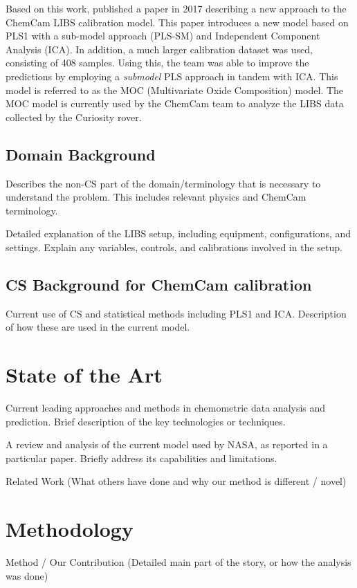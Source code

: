 Based on this work, \citeauthor{cleggRecalibrationMarsScience2017} published a paper in 2017 describing a new approach to the ChemCam LIBS calibration model.
This paper introduces a new model based on PLS1 with a sub-model approach (PLS-SM) and Independent Component Analysis (ICA).
In addition, a much larger calibration dataset was used, consisting of 408 samples.
Using this, the team was able to improve the predictions by employing a \textit{submodel} PLS approach in tandem with ICA.
This model is referred to as the MOC (Multivariate Oxide Composition) model.
The MOC model is currently used by the ChemCam team to analyze the LIBS data collected by the Curiosity rover.

\subsection{Domain Background}
Describes the non-CS part of the domain/terminology that is necessary to understand the problem.
This includes relevant physics and ChemCam terminology.

Detailed explanation of the LIBS setup, including equipment, configurations, and settings.
Explain any variables, controls, and calibrations involved in the setup.

\subsection{CS Background for ChemCam calibration}
Current use of CS and statistical methods including PLS1 and ICA.
Description of how these are used in the current model.

\section{State of the Art}
Current leading approaches and methods in chemometric data analysis and prediction.
Brief description of the key technologies or techniques.

A review and analysis of the current model used by NASA, as reported in a particular paper.
Briefly address its capabilities and limitations.

Related Work (What others have done and why our method is different / novel)

\section{Methodology}
Method / Our Contribution (Detailed main part of the story, or how the analysis was done)

